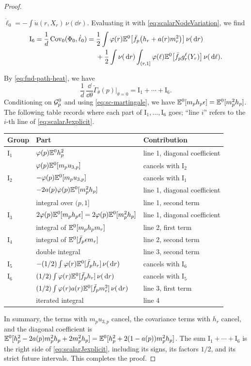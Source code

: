 \begin{proof}
\begin{enumerate}
 $\dot\ell_0=-\int\dot u(r,X_r)\,\nu(\dd r)$. Evaluating it with
 \eqref{eq:scalarNodeVariation}, we find
 \[
  \begin{aligned}
  \mathrm I_6=\frac1d\operatorname{Cov}_0(\Phi_0,\dot\ell_0)
  ={}&\frac12\int\varphi(r)\mathbb E^0\bigl[\bar f_p\bigl(h_r+a(r)m_r^2\bigr)\bigr]
   \,\nu(\,\mathrm d r)\\
  &+\frac12\int\nu(\,\mathrm d r)\int_{(r,1]}\varphi(\ell)
   \mathbb E^0\bigl[\bar f_pg_r^\ell(Y_r)\bigr]\,\nu(\,\mathrm d\ell).
  \end{aligned}
 \]
\end{enumerate}
By \eqref{eq:fnd-path-heat}, we have
\[
 \frac1d\,\frac{\dd}{\dd\theta}\widetilde\Gamma_\theta(p)\Big|_{\theta=0}
 =\mathrm I_1+\cdots+\mathrm I_6 .
\]
Conditioning on $\mathcal G^0_p$ and using \eqref{eq:sc-martingale}, we
have
$\mathbb E^0[m_ph_p\epsilon]=\mathbb E^0[m_p^2h_p]$. The following table records
where each part of $\mathrm I_1,\ldots,\mathrm I_6$ goes; ``line $i$''
refers to the $i$-th line of \eqref{eq:scalarJexplicit}.
\begin{center}
\small
\begin{tabular}{@{}lll@{}}
\toprule
Group & Part & Contribution\\
\midrule
$\mathrm I_1$ & $\varphi(p)\mathbb E^0h_p^2$ & line 1, diagonal coefficient\\
 & $\varphi(p)\mathbb E^0[m_pu_{3,p}]$ & cancels with $\mathrm I_2$\\
$\mathrm I_2$ & $-\varphi(p)\mathbb E^0[m_pu_{3,p}]$ & cancels with $\mathrm I_1$\\
 & $-2a(p)\varphi(p)\mathbb E^0[m_p^2h_p]$ & line 1, diagonal coefficient\\
 & integral over $(p,1]$ & line 1, second term\\
$\mathrm I_3$ & $2\varphi(p)\mathbb E^0[m_ph_p\epsilon]=2\varphi(p)\mathbb E^0[m_p^2h_p]$
 & line 1, diagonal coefficient\\
 & integral of $\mathbb E^0[m_ph_pm_r]$ & line 2, first term\\
$\mathrm I_4$ & integral of $\mathbb E^0[\bar f_p\epsilon m_r]$ & line 2, second term\\
 & double integral & line 3, second term\\
$\mathrm I_5$ & $-(1/2)\int\varphi(r)\mathbb E^0[\bar f_ph_r]\,\nu(\,\mathrm d r)$
 & cancels with $\mathrm I_6$\\
$\mathrm I_6$ & $(1/2)\int\varphi(r)\mathbb E^0[\bar f_ph_r]\,\nu(\,\mathrm d r)$
 & cancels with $\mathrm I_5$\\
 & $(1/2)\int\varphi(r)a(r)\mathbb E^0[\bar f_pm_r^2]\,\nu(\,\mathrm d r)$
 & line 3, first term\\
 & iterated integral & line 4\\
\bottomrule
\end{tabular}
\end{center}
In summary, the terms with $m_pu_{3,p}$ cancel, the covariance terms with
$h_r$ cancel, and the diagonal coefficient is
$\mathbb E^0[h_p^2-2a(p)m_p^2h_p+2m_p^2h_p]=\mathbb E^0[h_p^2+2(1-a(p))m_p^2h_p]$.
The sum $\mathrm I_1+\cdots+\mathrm I_6$ is the right side of
\eqref{eq:scalarJexplicit}, including its signs, its factors $1/2$, and
its strict future intervals. This completes the proof.
\end{proof}

